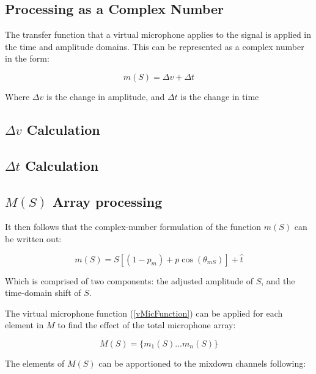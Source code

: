 \subsection{Processing as a Complex Number}

The transfer function that a virtual microphone applies to the signal is applied in the time and amplitude domains. This can be represented as a complex number in the form:

\begin{equation}\label{vMicFunction}
m(S) = \Delta{}v + \Delta{}t
\end{equation}

Where $\Delta v$ is the change in amplitude, and $\Delta t$ is the change in time

\subsection{$\Delta{}v$ Calculation}



\subsection{$\Delta{}t$ Calculation}



\subsection{$M(S)$ Array processing}

It then follows that the complex-number formulation of the function $m(S)$ can be written out:

\begin{equation}
	m(S) = S\left[\left(1 - p_m\right) + p\cos(\theta_{mS})\right] + \hat{t}
\end{equation}

Which is comprised of two components: the adjusted amplitude of $S$, and the time-domain shift of $S$.

The virtual microphone function (\ref{vMicFunction}) can be applied for each element in $M$ to find the effect of the total microphone array:

\begin{equation}
M(S) = \{m_1(S) ... m_n(S)\}
\end{equation}

The elements of $M(S)$ can be apportioned to the mixdown channels following:

